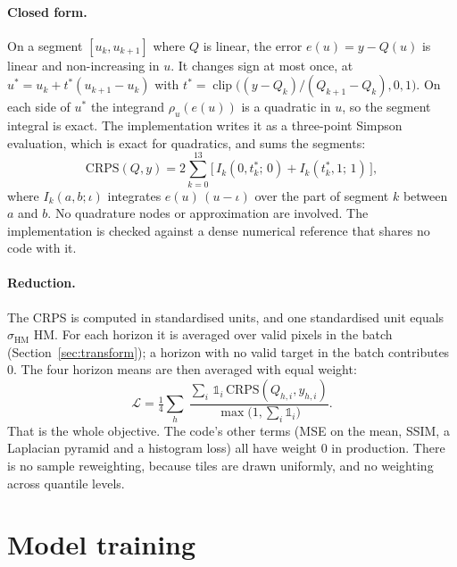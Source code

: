 \documentclass[11pt,a4paper]{article}
\newcommand{\HM}{\mathrm{HM}}
\begin{document}
\paragraph{Closed form.} On a segment $[u_k,u_{k+1}]$ where $Q$ is linear, the error
$e(u)=y-Q(u)$ is linear and non-increasing in $u$. It changes sign at most once, at
$u^*=u_k+t^*(u_{k+1}-u_k)$ with $t^*=\operatorname{clip}\big((y-Q_k)/(Q_{k+1}-Q_k),0,1\big)$.
On each side of $u^*$ the integrand $\rho_u(e(u))$ is a quadratic in $u$, so the segment
integral is exact. The implementation writes it as a three-point Simpson evaluation, which is
exact for quadratics, and sums the segments:
\[
\mathrm{CRPS}(Q,y) = 2\sum_{k=0}^{13}\Big[\,I_k(0,t^*_k;\,0) + I_k(t^*_k,1;\,1)\,\Big],
\]
where $I_k(a,b;\iota)$ integrates $e(u)\,(u-\iota)$ over the part of segment $k$ between $a$
and $b$. No quadrature nodes or approximation are involved. The implementation is checked
against a dense numerical reference that shares no code with it.

\paragraph{Reduction.} The CRPS is computed in standardised units, and one standardised unit
equals $\sigma_{\HM}$ HM. For each horizon it is averaged over valid pixels in the batch
(Section~\ref{sec:transform}); a horizon with no valid target in the batch contributes 0. The
four horizon means are then averaged with equal weight:
\[
\mathcal{L} = \tfrac14\sum_{h}\ \frac{\sum_{i}\,\mathbb{1}_i\,\mathrm{CRPS}(Q_{h,i},y_{h,i})}{\max\big(1,\sum_i \mathbb{1}_i\big)}.
\]
That is the whole objective. The code's other terms (MSE on the mean, SSIM, a Laplacian pyramid
and a histogram loss) all have weight 0 in production. There is no sample reweighting, because
tiles are drawn uniformly, and no weighting across quantile levels.

\section{Model training}
\label{sec:training}
\end{document}
